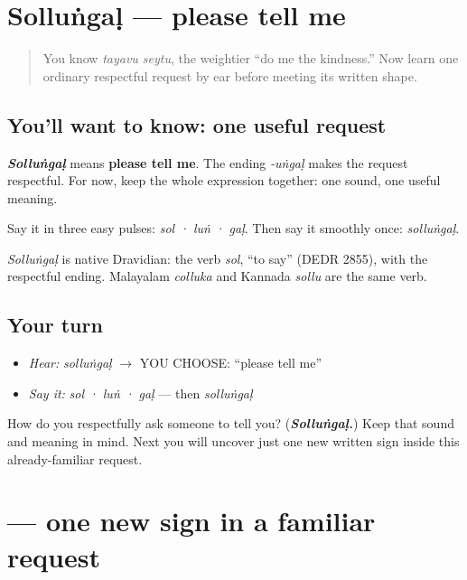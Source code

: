 \section[solluṅgaḷ]{Solluṅgaḷ — please tell me}

\label{lesson:TA-C08-sollungal}



\begin{quote}
You know \emph{tayavu seytu}, the weightier “do me the kindness.” Now learn one ordinary respectful request by ear before meeting its written shape.
\end{quote}

\subsection*{You'll want to know: one useful request}
\emph{\textbf{Solluṅgaḷ}} means \textbf{please tell me}. The ending \emph{-uṅgaḷ} makes the request respectful. For now, keep the whole expression together: one sound, one useful meaning.

Say it in three easy pulses: \emph{sol · luṅ · gaḷ}. Then say it smoothly once: \emph{solluṅgaḷ}.

\begin{cousinweb}
\emph{Solluṅgaḷ} is native Dravidian: the verb \emph{sol}, \textquotedblleft{}to say\textquotedblright{} (DEDR 2855), with the respectful ending. Malayalam \emph{colluka} and Kannada \emph{sollu} are the same verb.
\end{cousinweb}

\subsection*{Your turn}
\begin{itemize}
\raggedright
  \item \emph{Hear:} \emph{solluṅgaḷ} $\to$ YOU CHOOSE: “please tell me”
  \item \emph{Say it:} \emph{sol · luṅ · gaḷ} — then \emph{solluṅgaḷ}
\end{itemize}

\begin{tcolorbox}[breakable,colback=teal!4,colframe=teal!35!black,title={Before you move on}]
How do you respectfully ask someone to tell you? (\emph{\textbf{Solluṅgaḷ.}}) Keep that sound and meaning in mind. Next you will uncover just one new written sign inside this already-familiar request.
\end{tcolorbox}
\section[\texorpdfstring{\ta{சொ} (so)}{சொ (so)}]{ — one new sign in a familiar request}

